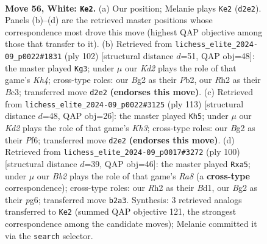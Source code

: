\documentclass[11pt]{article}
\begin{document}
\clearpage

\begin{figure}[p]\centering
\begin{subfigure}{0.46\textwidth}\centering
\resizebox{\linewidth}{!}{%
\newchessgame
\chessboard[
  setfen={3r1b2/7p/p2p2k1/P1n1p2p/2P1P3/1P3P2/1B1K2BR/8 w - - 8 56},
  showmover=false,
  pgfstyle=straightmove, color=movearrow, markmove={d2-e2}
]}
\caption{}
\end{subfigure}\hfill
\begin{subfigure}{0.46\textwidth}\centering
\resizebox{\linewidth}{!}{%
\newchessgame
\chessboard[
  setfen={8/3r2pk/R1p2p1p/3b3P/2p4K/2B2P2/1P4P1/8 w - - 17 52},
  showmover=false,
  pgfstyle=straightmove, color=movearrow, markmove={h4-g3}
]}
\caption{}
\end{subfigure}
\\[4pt]
\begin{subfigure}{0.46\textwidth}\centering
\resizebox{\linewidth}{!}{%
\newchessgame
\chessboard[
  setfen={4b3/8/5p1k/1PNp1p2/P1pPpP2/2K1P3/1P2R3/r7 b - - 2 57},
  showmover=false,
  pgfstyle=straightmove, color=movearrow, markmove={h6-h5}
]}
\caption{}
\end{subfigure}\hfill
\begin{subfigure}{0.46\textwidth}\centering
\resizebox{\linewidth}{!}{%
\newchessgame
\chessboard[
  setfen={R7/4rk2/2p3p1/p6p/P1Pnp2P/1P6/6P1/3BK3 w - - 0 51},
  showmover=false,
  pgfstyle=straightmove, color=movearrow, markmove={a8-a5}
]}
\caption{}
\end{subfigure}
\caption{\textbf{Move 56, White: \texttt{Ke2}.} (a) Our position; Melanie plays \texttt{Ke2} (\texttt{d2e2}). Panels (b)--(d) are the retrieved master positions whose correspondence most drove this move (highest QAP objective among those that transfer to it). (b) Retrieved from \texttt{lichess\_elite\_2024-09\_p0022\#1831} (ply 102) [structural distance $d$=51, QAP obj=48]: the master played \texttt{Kg3}; under $\mu$ our \emph{Kd2} plays the role of that game's \emph{Kh4}; cross-type roles: our \emph{B}g2 as their \emph{P}b2, our \emph{R}h2 as their \emph{B}c3; transferred move \texttt{d2e2} \textbf{(endorses this move)}. (c) Retrieved from \texttt{lichess\_elite\_2024-09\_p0022\#3125} (ply 113) [structural distance $d$=48, QAP obj=26]: the master played \texttt{Kh5}; under $\mu$ our \emph{Kd2} plays the role of that game's \emph{Kh3}; cross-type roles: our \emph{B}g2 as their \emph{P}f6; transferred move \texttt{d2e2} \textbf{(endorses this move)}. (d) Retrieved from \texttt{lichess\_elite\_2024-09\_p0017\#3272} (ply 100) [structural distance $d$=39, QAP obj=46]: the master played \texttt{Rxa5}; under $\mu$ our \emph{Bb2} plays the role of that game's \emph{Ra8} (a \textbf{cross-type} correspondence); cross-type roles: our \emph{R}h2 as their \emph{B}d1, our \emph{B}g2 as their \emph{p}g6; transferred move \texttt{b2a3}. Synthesis: 3 retrieved analogs transferred to \texttt{Ke2} (summed QAP objective 121, the strongest correspondence among the candidate moves); Melanie committed it via the \texttt{search} selector.}
\label{fig:thought-m110}
\end{figure}
\end{document}
